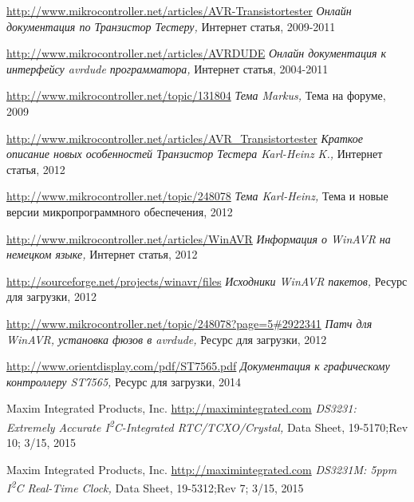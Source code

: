 \documentclass[12pt,a4paper,oneside,english]{report}
\begin{document}
\begin{thebibliography}{99}
\url{http://www.mikrocontroller.net/articles/AVR-Transistortester}
\emph{Онлайн документация по Транзистор Тестеру,}
Интернет статья,
2009-2011

\url{http://www.mikrocontroller.net/articles/AVRDUDE}
\emph{Онлайн документация к интерфейсу avrdude программатора,}
Интернет статья,
2004-2011

\url{http://www.mikrocontroller.net/topic/131804}
\emph{Тема Markus,}
Тема на форуме, 
2009

\url{http://www.mikrocontroller.net/articles/AVR\_Transistortester}
\emph{Краткое описание новых особенностей Транзистор Тестера Karl-Heinz K.,}
Интернет статья,
2012

\url{http://www.mikrocontroller.net/topic/248078}
\emph{Тема Karl-Heinz,}
Тема и новые версии микропрограммного обеспечения,
2012

\url{http://www.mikrocontroller.net/articles/WinAVR}
\emph{Информация о WinAVR на немецком языке,}
Интернет статья,
2012

\url{http://sourceforge.net/projects/winavr/files}
\emph{Исходники WinAVR пакетов,}
Ресурс для загрузки,
2012

\url{http://www.mikrocontroller.net/topic/248078?page=5#2922341}
\emph{Патч для WinAVR, установка фюзов в avrdude,}
Ресурс для загрузки,
2012

\url{http://www.orientdisplay.com/pdf/ST7565.pdf}
\emph{Документация к графическому контроллеру ST7565,}
Ресурс для загрузки,
2014

Maxim Integrated Products, Inc.
\url{http://maximintegrated.com}
\emph{DS3231: Extremely Accurate I\textsuperscript{2}C-Integrated RTC/TCXO/Crystal,}
Data Sheet,
19-5170;Rev 10; 3/15,
2015

Maxim Integrated Products, Inc.
\url{http://maximintegrated.com}
\emph{DS3231M: 5ppm I\textsuperscript{2}C Real-Time Clock,}
Data Sheet,
19-5312;Rev 7; 3/15,
2015


\end{thebibliography}
\end{document}
